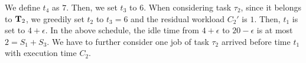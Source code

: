 We define $t_4$ as $7$. Then, we set $t_3$ to $6$. When considering
task $\tau_2$, since it belongs to ${\bf T}_2$, we greedily set $t_2$
to $t_3=6$ and the residual workload $C_2'$ is $1$. Then, $t_1$ is set
to $4+\epsilon$. In the above schedule, the idle time from
$4+\epsilon$ to $20-\epsilon$ is at most $2 = S_1+S_3$. We have to
further consider one job of task $\tau_2$ arrived before time $t_1$
with execution time $C_2$.
  
  
  

